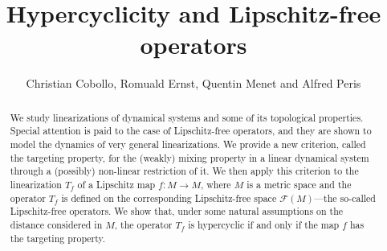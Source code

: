 \documentclass[12pt,english]{amsart}
\numberwithin{equation}{section}
\theoremstyle{plain}
\theoremstyle{definition}
\newcommand{\free}[1]{\mathcal{F}(#1)}
\begin{document}
\title{Hypercyclicity and
Lipschitz-free operators}



\author{Christian Cobollo, Romuald Ernst, Quentin Menet and Alfred Peris}

\address{Christian Cobollo,
Institut Universitari de Matemàtica Pura i Aplicada, Universitat Politècnica de València, Camí Vera S/N, 46022 València, SPAIN}

\address{Romuald Ernst,
Université du Littoral Côte d’Opale,  Laboratoire de Mathématiques Pures et Appliquées Joseph Liouville,  62228 Calais, FRANCE}

\address{Quentin Menet, Département de Mathématique, Université de Mons, 20 Place du Parc, 7000 Mons, BELGIUM}

\address{Alfred Peris,
Institut Universitari de Matemàtica Pura i Aplicada, Universitat Politècnica de València, Camí Vera S/N, 46022 València, SPAIN}





\begin{abstract}

We study linearizations of dynamical systems and some of its topological properties. Special attention is paid to the case of Lipschitz-free operators, and they are shown to model the dynamics of very general linearizations. We provide a new criterion, called the targeting property, for the (weakly) mixing property in a linear dynamical system through a (possibly) non-linear restriction of it. We then apply this criterion  to  the  linearization $T_f$ of a Lipschitz map $f\colon M\to M$, where $M$ is a metric space and the  operator $T_f$ is defined on the corresponding Lipschitz-free space $\free{M}$---the so-called Lipschitz-free operators. We show that, under some natural assumptions on the distance considered in $M$, the operator $T_f$ is hypercyclic if and only if the map $f$ has the targeting property.

\end{abstract}

\maketitle
\end{document}
